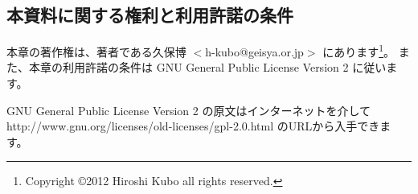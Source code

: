 \subsection*{本資料に関する権利と利用許諾の条件}


本章の著作権は、著者である久保博 $<$h-kubo@geisya.or.jp$>$ にあります\footnote{Copyright \copyright 2012 Hiroshi Kubo all rights reserved.}。
また、本章の利用許諾の条件は GNU General Public License Version 2 に従います。

GNU General Public License Version 2 の原文はインターネットを介して http://www.gnu.org/licenses/old-licenses/gpl-2.0.html のURLから入手できます。
